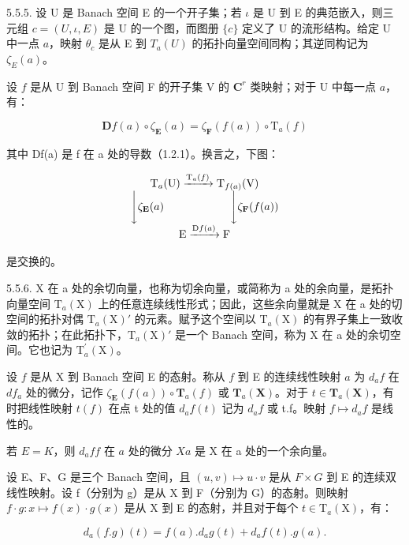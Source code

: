 5.5.5. 设 U 是 Banach 空间 E 的一个开子集；若 \(\iota\) 是 U 到 E 的典范嵌入，则三元组 \(c = (U, \iota, E)\) 是 U 的一个图，而图册 \(\{c\}\) 定义了 U 的流形结构。给定 U 中一点 \(a\)，映射 \(\theta_c\) 是从 E 到 \(T_a(U)\) 的拓扑向量空间同构；其逆同构记为 \(\zeta_E(a)\)。

设 \(f\) 是从 U 到 Banach 空间 F 的开子集 V 的 \(\mathbf{C}^{r}\) 类映射；对于 U 中每一点 \(a\)，有：

\[
\mathbf {D} f (a) \circ \zeta_ {\mathbf {E}} (a) = \zeta_ {\mathbf {F}} (f (a)) \circ \mathrm{T} _ {a} (f)
\]

其中 Df(a) 是 f 在 a 处的导数（1.2.1）。换言之，下图：

\[
\begin{array}{c} \mathrm{T} _ {a} (\mathrm{U}) \xrightarrow {\mathrm{T} _ {a} (f)} \mathrm{T} _ {f (a)} (\mathrm{V}) \\ \Biggl \downarrow \zeta_ {\mathbf {E}} (a) \qquad \qquad \qquad \Biggl \downarrow \zeta_ {\mathbf {F}} (f (a)) \\ \mathrm{E} \xrightarrow {\mathrm{D} f (a)} \mathrm{F} \end{array}
\]

是交换的。

5.5.6. X 在 a 处的余切向量，也称为切余向量，或简称为 a 处的余向量，是拓扑向量空间 \(\mathrm{T}_{a}(\mathrm{X})\) 上的任意连续线性形式；因此，这些余向量就是 X 在 a 处的切空间的拓扑对偶 \(\mathrm{T}_{a}(\mathrm{X})'\) 的元素。赋予这个空间以 \(\mathrm{T}_{a}(\mathrm{X})\) 的有界子集上一致收敛的拓扑；在此拓扑下，\(\mathrm{T}_{a}(\mathrm{X})'\) 是一个 Banach 空间，称为 X 在 a 处的余切空间。它也记为 \(\mathrm{T}_{a}^{\prime}(\mathrm{X})\)。

设 \(f\) 是从 X 到 Banach 空间 E 的态射。称从 \(f\) 到 E 的连续线性映射 \(a\) 为 \(d_{a}f\) 在 \(df_{a}\) 处的微分，记作 \(\zeta_{\mathbf{E}}(f(a)) \circ \mathbf{T}_{a}(f)\) 或 \(\mathbf{T}_{a}(\mathbf{X})\)。对于 \(t \in \mathbf{T}_{a}(\mathbf{X})\)，有时把线性映射 \(t(f)\) 在点 t 处的值 \(d_{a}f(t)\) 记为 \(d_{a}f\) 或 t.f。映射 \(f \mapsto d_{a}f\) 是线性的。

若 \(E = K\)，则 \(d_a f\)\(f\) 在 \(a\) 处的微分 \(X\)\(a\) 是 X 在 a 处的一个余向量。

设 E、F、G 是三个 Banach 空间，且 \((u, v) \mapsto u \cdot v\) 是从 \(F \times G\) 到 E 的连续双线性映射。设 f（分别为 g）是从 X 到 F（分别为 G）的态射。则映射 \(f \cdot g : x \mapsto f(x) \cdot g(x)\) 是从 X 到 E 的态射，并且对于每个 \(t \in \mathrm{T}_{a}(\mathrm{X})\)，有：

\[
d _ {a} (f. g) (t) = f (a). d _ {a} g (t) + d _ {a} f (t). g (a).
\]

